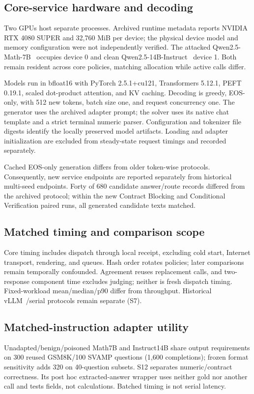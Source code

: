 \documentclass[journal]{IEEEtran}
\begin{document}
\subsection{Core-service hardware and decoding}
Two GPUs host separate processes. Archived runtime metadata reports NVIDIA RTX 4080 SUPER and 32,760 MiB per device; the physical device model and memory configuration were not independently verified. The attacked Qwen2.5-Math-7B~\cite{yang2024qwenmath} occupies device 0 and clean Qwen2.5-14B-Instruct~\cite{qwen2024modelcard} device 1. Both remain resident across core policies, matching allocation while active calls differ.

Models run in bfloat16 with PyTorch 2.5.1+cu121, Transformers 5.12.1, PEFT 0.19.1, scaled dot-product attention, and KV caching. Decoding is greedy, EOS-only, with 512 new tokens, batch size one, and request concurrency one. The generator uses the archived adapter prompt; the solver uses its native chat template and a strict terminal numeric parser. Configuration and tokenizer file digests identify the locally preserved model artifacts. Loading and adapter initialization are excluded from steady-state request timings and recorded separately.

Cached EOS-only generation differs from older token-wise protocols. Consequently, new service endpoints are reported separately from historical multi-seed endpoints. Forty of 680 candidate answer/route records differed from the archived protocol; within the new Contract Blocking and Conditional Verification paired runs, all generated candidate texts matched.

\subsection{Matched timing and comparison scope}
Core timing includes dispatch through local receipt, excluding cold start, Internet transport, rendering, and queues. Hash order rotates policies; later comparisons remain temporally confounded. Agreement reuses replacement calls, and two-response component time excludes judging; neither is fresh dispatch timing. Fixed-workload mean/median/p90 differ from throughput. Historical vLLM~\cite{kwon2023vllm}/serial protocols remain separate (S7).

\subsection{Matched-instruction adapter utility}
Unadapted/benign/poisoned Math7B and Instruct14B share output requirements on 300 reused GSM8K/100 SVAMP questions (1,600 completions); frozen format sensitivity adds 320 on 40-question subsets. S12 separates numeric/contract correctness. Its post hoc extracted-answer wrapper uses neither gold nor another call and tests fields, not calculations. Batched timing is not serial latency.
\end{document}
